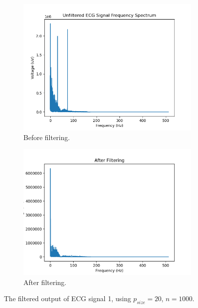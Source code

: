\documentclass[a4paper, 11pt]{article}
\begin{document}
    \begin{figure}[h!]
        \centering  
        \begin{subfigure}[b]{0.5\linewidth}
            \graphicspath{{./wiki/}}
            \includegraphics[width=\linewidth]{ECG_freq_spectrum.png}
            \caption{Before filtering.}
        \end{subfigure}%
        \begin{subfigure}[b]{0.5\linewidth}
            \graphicspath{{./wiki/}}
            \includegraphics[width=\linewidth]{af_filtering_1kGen20Pop.png}
            \caption{After filtering.}
        \end{subfigure}
        \caption{The filtered output of ECG signal 1, using $p_{size} = 20$, $n = 1000$.}
        \label{Fig:result_1}
    \end{figure}
\end{document}
